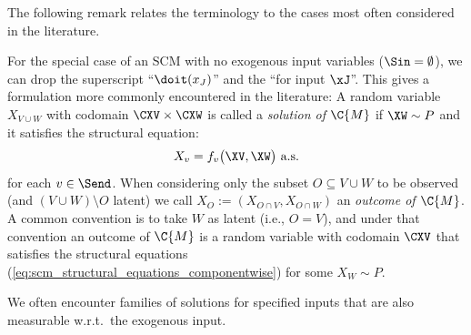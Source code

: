The following remark relates the terminology to the cases most often considered in the literature.
\begin{Rem}
  For the special case of an SCM with no exogenous input variables ($\Sin = \emptyset$), we can
  drop the superscript ``$\doit(x_J)$'' and the ``for input $\xJ$''. This gives a formulation more
  commonly encountered in the literature:
  A random variable $X_{V \cup W}$ with codomain $\CXV \times \CXW$ is called
  a \emph{solution of $\C{M}$} if $\XW \sim P$ and
  it satisfies the structural equation:
  \begin{equation}\label{eq:scm_structural_equations_componentwise}
    X_v = f_v\big(\XV, \XW\big) \text{ a.s.}
  \end{equation}
  for each $v \in \Send$.
  When considering only the subset $O \subseteq V \cup W$ to be observed (and $(V \cup W) \setminus O$ latent)
  we call $X_O := (X_{O \cap V},X_{O\cap W})$ an 
  \emph{outcome of $\C{M}$}.
  A common convention is to take $W$ as latent (i.e., $O = V$), and under that convention an outcome of $\C{M}$ is 
  a random variable with codomain $\CXV$ that satisfies the structural equations
  (\ref{eq:scm_structural_equations_componentwise}) for some $X_W \sim P$.
\end{Rem}
We often encounter families of solutions for specified inputs that are also measurable w.r.t.\ the exogenous input.
